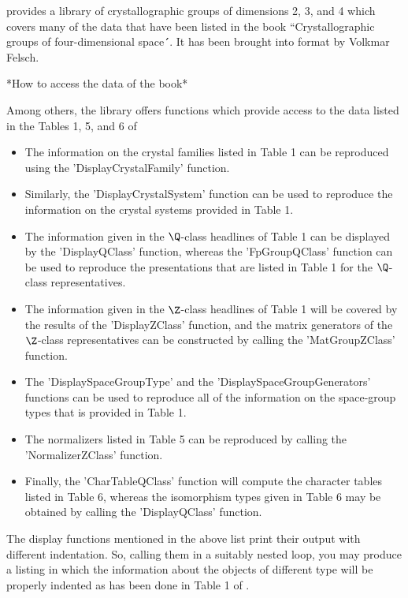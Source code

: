 {\GAP} provides a library of  crystallographic groups of dimensions 2, 3,
and 4  which covers many of the  data that have been  listed  in the book
``Crystallographic groups of four-dimensional space\'\'\  \cite{BBNWZ78}.
It has been brought into {\GAP} format by Volkmar Felsch.

\vspace{5mm}
*How to access the data of the book*

Among others,  the library  offers functions  which provide access to the
data listed in the Tables 1, 5, and 6 of \cite{BBNWZ78}\:
\begin{itemize}
\item The information  on the crystal families  listed in Table 1  can be
      reproduced using the 'DisplayCrystalFamily' function.
\item Similarly,  the  'DisplayCrystalSystem'  function  can  be  used to
      reproduce the information on the crystal systems  provided in Table
      1.
\item The information  given in the $\Q$-class  headlines  of Table 1 can
      be  displayed   by  the   'DisplayQClass'  function,   whereas  the
      'FpGroupQClass' function can be used to reproduce the presentations
      that are listed in Table 1 for the $\Q$-class representatives.
\item The information  given in the $\Z$-class  headlines of Table 1 will
      be covered by the results of the 'DisplayZClass' function,  and the
      matrix  generators   of  the  $\Z$-class  representatives   can  be
      constructed by calling the 'MatGroupZClass' function.
\item The  'DisplaySpaceGroupType' and the  'DisplaySpaceGroupGenerators'
      functions  can be used  to reproduce  all of the information on the
      space-group types that is provided in Table 1.
\item The normalizers  listed in Table 5 can be reproduced by calling the
      'NormalizerZClass' function.
\item Finally,  the 'CharTableQClass' function will compute the character
      tables  listed in Table 6,  whereas the  isomorphism types given in
      Table 6  may be obtained  by calling the  'DisplayQClass' function.
      \vspace{-2mm}
\end{itemize}
The display functions mentioned in the above list print their output with
different  indentation.  So, calling them in  a suitably nested loop, you
may produce a  listing  in which  the  information about  the objects  of
different type will be properly  indented as has been  done in Table 1 of
\cite{BBNWZ78}.

